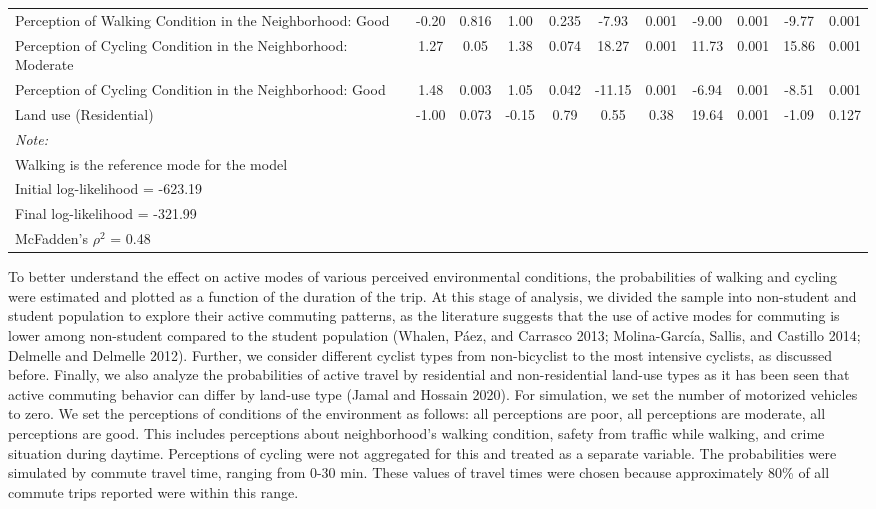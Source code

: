 \documentclass[]{elsarticle} %
\begin{document}
\begin{landscape}
\begin{table}
{\begin{tabular}[t]{l|cc|cc|cc|cc|cc|}
Perception of Walking Condition in the Neighborhood: Good & -0.20 & 0.816 & 1.00 & 0.235 & -7.93 & 0.001 & -9.00 & 0.001 & -9.77 & 0.001\\
Perception of Cycling Condition in the Neighborhood: Moderate & 1.27 & 0.05 & 1.38 & 0.074 & 18.27 & 0.001 & 11.73 & 0.001 & 15.86 & 0.001\\
\addlinespace
Perception of Cycling Condition in the Neighborhood: Good & 1.48 & 0.003 & 1.05 & 0.042 & -11.15 & 0.001 & -6.94 & 0.001 & -8.51 & 0.001\\
Land use (Residential) & -1.00 & 0.073 & -0.15 & 0.79 & 0.55 & 0.38 & 19.64 & 0.001 & -1.09 & 0.127\\
\bottomrule
\multicolumn{11}{l}{\textit{Note: }}\\
\multicolumn{11}{l}{Walking is the reference mode for the model}\\
\multicolumn{11}{l}{Initial log-likelihood  =  -623.19}\\
\multicolumn{11}{l}{Final log-likelihood  =  -321.99}\\
\multicolumn{11}{l}{McFadden's $\rho ^ 2$  =  0.48}\\
\end{tabular}}
\end{table}
\end{landscape}

To better understand the effect on active modes of various perceived
environmental conditions, the probabilities of walking and cycling were
estimated and plotted as a function of the duration of the trip. At this
stage of analysis, we divided the sample into non-student and student
population to explore their active commuting patterns, as the literature
suggests that the use of active modes for commuting is lower among
non-student compared to the student population (Whalen, Páez, and
Carrasco 2013; Molina-García, Sallis, and Castillo 2014; Delmelle and
Delmelle 2012). Further, we consider different cyclist types from
non-bicyclist to the most intensive cyclists, as discussed before.
Finally, we also analyze the probabilities of active travel by
residential and non-residential land-use types as it has been seen that
active commuting behavior can differ by land-use type (Jamal and Hossain
2020). For simulation, we set the number of motorized vehicles to zero.
We set the perceptions of conditions of the environment as follows: all
perceptions are poor, all perceptions are moderate, all perceptions are
good. This includes perceptions about neighborhood's walking condition,
safety from traffic while walking, and crime situation during daytime.
Perceptions of cycling were not aggregated for this and treated as a
separate variable. The probabilities were simulated by commute travel
time, ranging from 0-30 min. These values of travel times were chosen
because approximately 80\% of all commute trips reported were within
this range.
\end{document}
